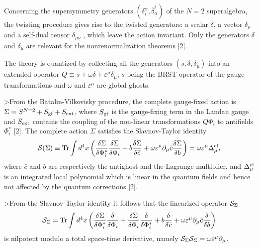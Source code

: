 \documentclass[a4paper,a4paper]{article}
\begin{document}
Concerning the supersymmetry generators $(\delta _i^\alpha ,\overline{\delta 
}_{\dot{\alpha}}^i)$ of the $N=2$ superalgebra, the
twisting procedure gives rise to the twisted generators: a scalar $%
\delta $, a vector $\delta _\mu $ and a self-dual tensor $\delta _{\mu \nu }$%
, which leave the action invariant. Only the generators $\delta $ and 
$\delta _\mu $ are relevant for the nonrenormalization theorems [2].

The theory is quantized by collecting all the generators $%
(s,\delta ,\delta _\mu )$ into an extended operator $Q \equiv s+\omega \delta +\varepsilon ^\mu \delta _\mu$, $s$ being the BRST operator of the gauge transformations and $\omega $ and $\varepsilon ^\mu $ are global ghosts. 

>From the Batalin-Vilkovisky procedure, the complete gauge-fixed
action is $\Sigma =S^{N=2}+S_{{\rm gf}}+S_{{\rm ext}} $,  
where $S_{{\rm gf}}$ is the gauge-fixing term in the Landau gauge and $S_{%
{\rm ext}}$ contains the coupling of the non-linear transformations $Q\Phi _i
$ to antifields $\Phi _i^{*}$ [2]. 
The complete action $\Sigma $ satisfies the Slavnov-Taylor identity 
\begin{eqnarray}
{\cal S}(\Sigma )\equiv {\rm Tr}\int d^4x\left( \frac{\delta \Sigma }{\delta \Phi
_i^{*}}\frac{\delta \Sigma }{\delta \Phi _i}+b\frac{\delta \Sigma }{\delta 
\bar{c}}+\omega \varepsilon ^\mu \partial _\mu \bar{c}\frac{\delta \Sigma }{%
\delta b}\right) = \omega \varepsilon ^\mu \Delta _\mu ^{{\rm cl}}, \nonumber
\end{eqnarray}
where $ \bar c$ and $b$ are respectively the antighost and the Lagrange multiplier, and $\Delta _\mu ^{{\rm cl}}$ is an integrated local polynomial which is linear in the 
quantum fields and hence not affected by the quantum corrections [2].

>From the Slavnov-Taylor identity it follows that the linearized operator $%
{\cal S}_\Sigma $ 
\begin{eqnarray}
{\cal S}_\Sigma ={\rm Tr}\int d^4x\left( \frac{\delta \Sigma }{\delta \Phi
_i^{*}}\frac \delta {\delta \Phi _i}+\frac{\delta \Sigma }{\delta \Phi _i}%
\frac \delta {\delta \Phi _i^{*}}+b\frac \delta {\delta \bar{c}}+\omega
\varepsilon ^\mu \partial _\mu \bar{c}\frac \delta {\delta b}\right) 
\nonumber
\end{eqnarray}
is nilpotent modulo a total space-time derivative, namely  
${\cal S}_\Sigma {\cal S}_\Sigma =\omega \varepsilon ^\mu \partial _\mu $. 
\end{document}
